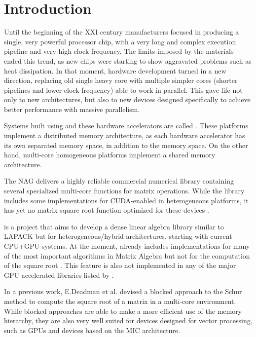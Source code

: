 \section{Introduction}
\label{sec:intro}

Until the beginning of the XXI century \cpu manufacturers focused in producing a single, very powerful processor chip, with a very long and complex execution pipeline and very high clock frequency. The limits imposed by the materials ended this trend, as new chips were starting to show aggravated problems such as heat dissipation. In that moment, hardware development turned in a new direction, replacing old single heavy core \cpus with multiple simpler cores (shorter pipelines and lower clock frequency) able to work in parallel. This gave life not only to new \cpu architectures, but also to new devices designed specifically to achieve better performance with massive parallelism.

Systems built using \cpus and these hardware accelerators are called \hetplats. These platforms implement a distributed memory architecture, as each hardware accelerator has its own separated memory space, in addition to the \cpu memory space. On the other hand, multi-core homogeneous platforms implement a shared memory architecture.

The \acf{NAG}\cite{NAG} delivers a highly reliable commercial numerical library containing several specialized multi-core functions for matrix operations. While the \nag library includes some implementations for CUDA-enabled \gpus in heterogeneous platforms, it has yet no matrix square root function optimized for these devices \cite{NAG:GPU:0:6}.

\magma is a project that aims to develop a dense linear algebra library similar to LAPACK but for heterogeneous/hybrid architectures, starting with current CPU+GPU systems. At the moment, \magma already includes implementations for many of the most important algorithms in Matrix Algebra but not for the computation of the square root \cite{PLASMA:MAGMA}. This feature is also not implemented in any of the major GPU accelerated libraries listed by \nvidia \cite{ACCELEREYES:WIKI:SQRTM,CULA:LAPACK,NVIDIA:CUBLAS:5:0,NVIDIA:CUSPARSE:5:0,CUSP:FEATURES}.

In a previous work, E.Deadman et al. \cite{Deadman:Higham:Ralha:2012} devised a blocked approach to the Schur method to compute the square root of a matrix in a multi-core environment. While blocked approaches are able to make a more efficient use of the memory hierarchy, they are also very well suited for devices designed for vector processing, such as \acfp{GPU} and devices based on the \acf{MIC} architecture.

